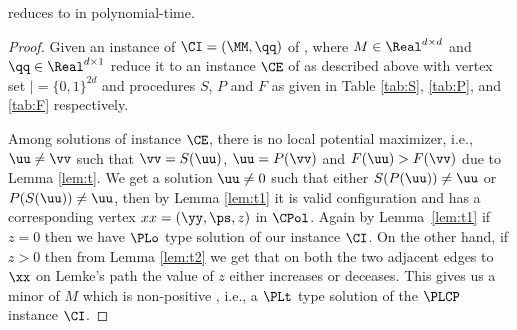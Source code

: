 \begin{theorem}
\PLCP reduces to \EOPL in polynomial-time. 
\end{theorem}
\begin{proof}
	Given an instance of $\CI=(\MM,\qq)$ of \PLCP, where $M\in \Real^{d\times d}$ and $\qq\in \Real^{d\times 1}$ reduce it to an instance $\CE$ of \EOPL as described above with vertex set $\vert=\{0,1\}^{2d}$ and procedures $S$, $P$ and $F$ as given in Table \ref{tab:S}, \ref{tab:P}, and \ref{tab:F} respectively.

Among solutions of \EOPL instance $\CE$, there is no local potential maximizer,
	i.e., $\uu\neq \vv$ such that $\vv=S(\uu)$, $\uu=P(\vv)$ and $F(\uu)>F(\vv)$
	due to Lemma \ref{lem:t}. We get a solution $\uu \neq 0$ such that either
	$S(P(\uu))\neq \uu$ or $P(S(\uu))\neq \uu$, then by Lemma \ref{lem:t1} it is
	valid configuration and has a corresponding vertex $xx=(\yy,\ps,z)$ in
	$\CPol$. Again by Lemma~\ref{lem:t1} if $z=0$ then we have $\PLo$ type solution
	of our \PLCP instance $\CI$. On the other hand, if $z>0$ then from Lemma
	\ref{lem:t2} we get that on both the two adjacent edges to $\xx$ on Lemke's
	path the value of $z$ either increases or deceases. This gives us a minor of $M$
	which is non-positive \cite{}, i.e., a $\PLt$ type solution of the $\PLCP$
	instance $\CI$.
\end{proof}

